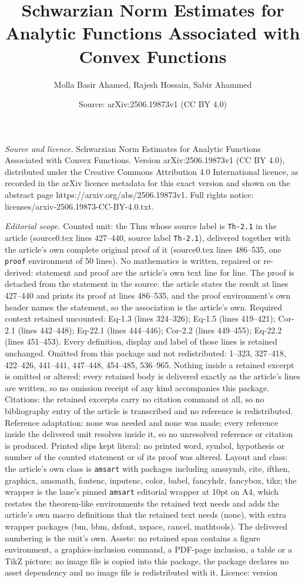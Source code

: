 \documentclass[10pt,a4paper]{amsart}
\title[Schwarzian Norm Estimates for Analytic Functions Associated ]{Schwarzian Norm Estimates for Analytic Functions Associated with Convex Functions}
\author{Molla Basir Ahamed, Rajesh Hossain, Sabir Ahammed}
\date{Source: arXiv:2506.19873v1 (CC BY 4.0)}
\begin{document}
\maketitle

\noindent\emph{Source and licence.} Schwarzian Norm Estimates for Analytic Functions Associated with Convex Functions. Version arXiv:2506.19873v1 (CC BY 4.0), distributed under the Creative Commons Attribution 4.0 International licence, as recorded in the arXiv licence metadata for this exact version and shown on the abstract page https://arxiv.org/abs/2506.19873v1. Full rights notice: licenses/arxiv-2506.19873-CC-BY-4.0.txt.\par\smallskip

\noindent\textit{Editorial scope.} Counted unit: the Thm whose source label is \texttt{Th-2.1} in the article (source0.tex lines 427--440, source label \texttt{Th-2.1}), delivered together with the article's own complete original proof of it (source0.tex lines 486--535, one \texttt{proof} environment of 50 lines). No mathematics is written, repaired or re-derived: statement and proof are the article's own text line for line. The proof is detached from the statement in the source: the article states the result at lines 427--440 and prints its proof at lines 486--535, and the proof environment's own header names the statement, so the association is the article's own. Required context retained uncounted: Eq-1.3 (lines 324--326); Eq-1.5 (lines 419--421); Cor-2.1 (lines 442--448); Eq-22.1 (lines 444--446); Cor-2.2 (lines 449--455); Eq-22.2 (lines 451--453). Every definition, display and label of those lines is retained unchanged. Omitted from this package and not redistributed: 1--323, 327--418, 422--426, 441--441, 447--448, 454--485, 536--965. Nothing inside a retained excerpt is omitted or altered: every retained body is delivered exactly as the article's lines are written, so no omission receipt of any kind accompanies this package. Citations: the retained excerpts carry no citation command at all, so no bibliography entry of the article is transcribed and no reference is redistributed. Reference adaptation: none was needed and none was made; every reference inside the delivered unit resolves inside it, so no unresolved reference or citation is produced. Printed slips kept literal: no printed word, symbol, hypothesis or number of the counted statement or of its proof was altered. Layout and class: the article's own class is \texttt{amsart} with packages including amssymb, cite, ifthen, graphicx, amsmath, fontenc, inputenc, color, babel, fancyhdr, fancybox, tikz; the wrapper is the lane's pinned \texttt{amsart} editorial wrapper at 10pt on A4, which restates the theorem-like environments the retained text needs and adds the article's own macro definitions that the retained text needs (none), with extra wrapper packages (bm, bbm, dsfont, xspace, cancel, mathtools). The delivered numbering is the unit's own. Assets: no retained span contains a figure environment, a graphics-inclusion command, a PDF-page inclusion, a table or a TikZ picture; no image file is copied into this package, the package declares no asset dependency and no image file is redistributed with it. Licence: version 
\end{document}
